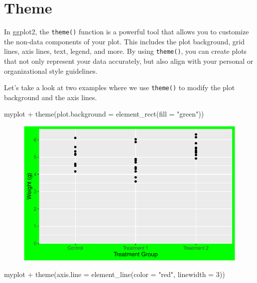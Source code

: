 \documentclass[
  letterpaper,
  DIV=11,
  numbers=noendperiod]{scrartcl}
\newenvironment{Shaded}{\begin{snugshade}}{\end{snugshade}}
\newcommand{\AttributeTok}[1]{\textcolor[rgb]{0.40,0.45,0.13}{#1}}
\newcommand{\DecValTok}[1]{\textcolor[rgb]{0.68,0.00,0.00}{#1}}
\newcommand{\FunctionTok}[1]{\textcolor[rgb]{0.28,0.35,0.67}{#1}}
\newcommand{\NormalTok}[1]{\textcolor[rgb]{0.00,0.23,0.31}{#1}}
\newcommand{\SpecialCharTok}[1]{\textcolor[rgb]{0.37,0.37,0.37}{#1}}
\newcommand{\StringTok}[1]{\textcolor[rgb]{0.13,0.47,0.30}{#1}}
\begin{document}
\hypertarget{theme}{%
\section{Theme}\label{theme}}

In ggplot2, the \texttt{theme()} function is a powerful tool that allows
you to customize the non-data components of your plot. This includes the
plot background, grid lines, axis lines, text, legend, and more. By
using \texttt{theme()}, you can create plots that not only represent
your data accurately, but also align with your personal or
organizational style guidelines.

Let's take a look at two examples where we use \texttt{theme()} to
modify the plot background and the axis lines.

\begin{Shaded}
\begin{Highlighting}[]
\NormalTok{myplot }\SpecialCharTok{+}
  \FunctionTok{theme}\NormalTok{(}\AttributeTok{plot.background =} \FunctionTok{element\_rect}\NormalTok{(}\AttributeTok{fill =} \StringTok{"green"}\NormalTok{))}
\end{Highlighting}
\end{Shaded}

\begin{figure}[H]

{\centering \includegraphics{ggplot2intro_files/figure-pdf/unnamed-chunk-17-1.pdf}

}

\end{figure}

\begin{Shaded}
\begin{Highlighting}[]
\NormalTok{myplot }\SpecialCharTok{+}
  \FunctionTok{theme}\NormalTok{(}\AttributeTok{axis.line =} \FunctionTok{element\_line}\NormalTok{(}\AttributeTok{color =} \StringTok{"red"}\NormalTok{, }\AttributeTok{linewidth =} \DecValTok{3}\NormalTok{))}
\end{Highlighting}
\end{Shaded}
\end{document}
